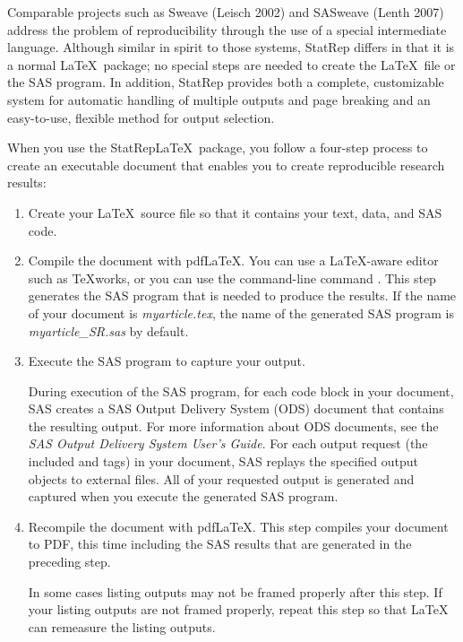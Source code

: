 \documentclass[article,oneside]{memoir}
\newcommand*{\StatRep}{\textsf{StatRep}\xspace}
\begin{document}
Comparable projects such as Sweave (Leisch 2002) and SASweave  (Lenth 2007)
address the problem of reproducibility through the use of a special intermediate language.
Although similar in spirit to those systems, \StatRep differs in that it is a
normal \LaTeX\ package; no special steps are needed to create the \LaTeX\
file or the SAS program.   In addition, \StatRep provides both a complete, customizable system for
automatic handling of multiple outputs and page breaking and an easy-to-use,
flexible method for output selection.

When you use the \StatRep \LaTeX\ package, you follow a four-step process to
create an executable document that enables you to create
reproducible research results:
\begin{enumerate}
\item Create your \LaTeX\ source file so that it contains your text, data, and SAS code.

\item Compile the document with pdf\LaTeX. You can use a LaTeX-aware
      editor such as \TeX works, or you can use the command-line command .
      This step generates the SAS program that is needed to produce the results.
      If the name of your document is \textit{myarticle.tex}, the name of the generated SAS
      program is \textit{myarticle\_SR.sas} by default.

\item Execute the SAS program to capture your output.

During execution of the SAS program, for each code block in your document,
SAS creates a SAS Output Delivery System (ODS) document that contains the resulting output.
For more information about ODS documents, see the
\textit{SAS Output Delivery System User's Guide}.
For each output request (the included  and  tags) in your document, SAS replays the specified output objects
to external files. All of your requested output is generated and captured when you
execute the generated SAS program.

\item Recompile the document with pdfLaTeX. This step compiles your
      document to PDF, this time including the SAS results
      that are generated in the preceding step.

      In some cases listing outputs may not be framed properly after this step.
      If your listing outputs are not framed properly, repeat this step so that
      LaTeX can remeasure the listing outputs.

\end{enumerate}
\end{document}
